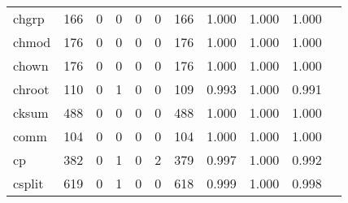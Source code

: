 \begin{longtable}{lp{1.10cm}p{1.10cm}p{1.10cm}p{1.10cm}p{1.10cm}p{1.10cm}p{1.10cm}p{1.10cm}p{1.10cm}p{1.10cm}}
chgrp     &                    166 &                                  0 &                                 0 &                                0 &                                 0 &                             166 &                          1.000 &                                 1.000 &                               1.000 \\
chmod     &                    176 &                                  0 &                                 0 &                                0 &                                 0 &                             176 &                          1.000 &                                 1.000 &                               1.000 \\
chown     &                    176 &                                  0 &                                 0 &                                0 &                                 0 &                             176 &                          1.000 &                                 1.000 &                               1.000 \\
chroot    &                    110 &                                  0 &                                 1 &                                0 &                                 0 &                             109 &                          0.993 &                                 1.000 &                               0.991 \\
cksum     &                    488 &                                  0 &                                 0 &                                0 &                                 0 &                             488 &                          1.000 &                                 1.000 &                               1.000 \\
comm      &                    104 &                                  0 &                                 0 &                                0 &                                 0 &                             104 &                          1.000 &                                 1.000 &                               1.000 \\
cp        &                    382 &                                  0 &                                 1 &                                0 &                                 2 &                             379 &                          0.997 &                                 1.000 &                               0.992 \\
csplit    &                    619 &                                  0 &                                 1 &                                0 &                                 0 &                             618 &                          0.999 &                                 1.000 &                               0.998 \\

\end{longtable}
